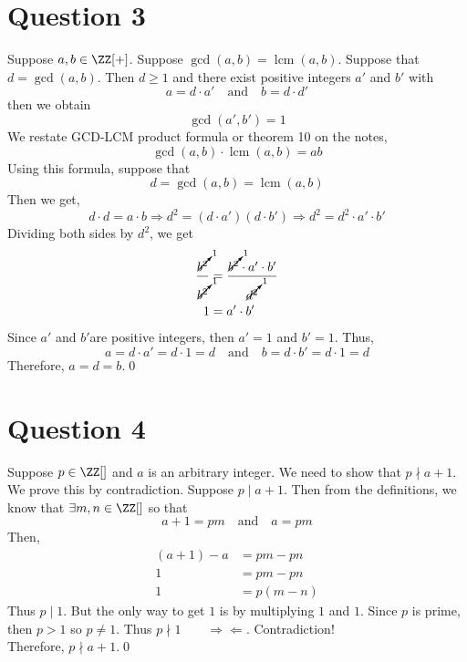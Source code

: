 \documentclass{report}
\DeclareMathOperator{\lcm}{lcm}
\begin{document}
\section*{Question 3}
Suppose \(a,b \in \ZZ[+]\). Suppose \(\gcd(a,b) = \lcm(a,b)\). Suppose that \(d = \gcd(a,b)\).
Then \(d\geq 1\) and there exist positive integers \(a'\) and \(b'\) with \[a = d \cdot a'  \quad\text{and}\quad b = d\cdot d'\]
then we obtain \[\gcd(a',b') = 1\]
We restate GCD-LCM product formula or theorem 10 on the notes, \[\gcd(a,b) \cdot \lcm(a,b) = ab\]
Using this formula, suppose that \[d = \gcd(a,b) = \lcm(a,b)\]
Then we get, \[d \cdot d = a\cdot b \Rightarrow d^2 = (d\cdot a')(d\cdot b')\Rightarrow d^2 = d^2\cdot a'\cdot b'\]
Dividing both sides by \(d^2\), we get
\begin{align*}
    \frac{\cancelto{1}{b^2}}{\cancelto{1}{b^2}} &= \frac{\cancelto{1}{b^2}\cdot a' \cdot b'}{\cancelto{1}{d^2}}\\
    1 & = a'\cdot b'
\end{align*}
Since \(a'\) and \(b'\)are positive integers, then \(a' = 1\) and \(b' = 1\). Thus,
\[a = d \cdot a' = d\cdot1 = d \quad\text{and}\quad b = d\cdot b' = d \cdot 1 = d\]
Therefore, \(a = d = b\).\qed

\section*{Question 4}
Suppose \(p \in \ZZ[]\) and \(a\) is an arbitrary integer. We need to show that \(p \nmid a + 1\). We prove this by contradiction.
Suppose \( p \mid a +1\). Then from the definitions, we know that \(\exists m,n \in \ZZ[]\) so that 
\[a + 1 = pm \quad \text{and}\quad a = pm\]
Then, 
\begin{align*}
    ( a + 1) - a & = pm - pn \\
    1 & = pm -pn \\
    1 & = p(m  -n)
\end{align*}
Thus \(p \mid 1\). But the only way to get \(1\) is by multiplying \(1\) and \(1\). Since \(p\) is prime, then \(p >1\) so \(p \neq 1\).
Thus \(p \nmid 1 \qquad \Rightarrow\Leftarrow\). Contradiction!\\
Therefore, \(p \nmid a + 1\).\qed
\end{document}
